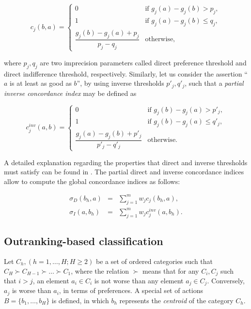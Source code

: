 \documentclass[]{elsarticle}
\theoremstyle{definition}
\begin{document}
{\footnotesize
\begin{equation}
c_j(b,a) =
\begin{cases}
	0							& \mbox{if  $g_j(a)-g_j(b) > p_j$}, \\
	1							& \mbox{if  $g_j(a)-g_j(b) \leq q_j$},   \\
	\dfrac{g_j(b)-g_j(a)+p_j}{p_j-q_j} 	& \mbox{otherwise}, 				     	      
 \end{cases} 
 \label{credibility}
 \end{equation} 
}

\noindent
where $p_j,q_j$ are two imprecision parameters called direct preference threshold and  direct indifference threshold, respectively.  Similarly,  let us consider the assertion ``$a$ is at least as good as $b$'', by using inverse thresholds $p'_j,q'_j$, such that a \emph{partial inverse concordance index} may be defined as 

{\fontsize{7}{7}
\begin{equation}
c^{inv}_j(a,b) =
\begin{cases}
	0							& \mbox{if  $g_j(b)-g_j(a) > p'_j$}, \\
	1							& \mbox{if  $g_j(b)-g_j(a) \leq q'_j$},   \\
	\dfrac{g_j(a)-g_j(b)+p'_j}{p'_j-q'_j} 	& \mbox{otherwise}. 				     	      
 \end{cases} 
 \label{invcredibility}
 \end{equation} 
}


\noindent
A detailed explanation regarding the properties that direct and inverse thresholds must satisfy can be found in \cite{roy2012}.  The partial direct and inverse concordance indices allow to compute the global concordance indices as follows:

\begin{eqnarray}
\sigma_D(b_h,a) 	&=& \sum_{j=1}^{m} w_j c_j(b_h,a),\label{generalsigmaDG}\\
\sigma_I(a,b_h) 	&=& \sum_{j=1}^{m} w_j c^{inv}_j(a,b_h). \label{generalsigmaIG}
\end{eqnarray} 


\subsection{Outranking-based classification}\label{outrankingclass}

Let $C_h, (h=1,\ldots,H; H\geq 2)$ be a set of ordered categories such that $C_H \succ C_{H-1}\succ \ldots \succ C_1$, where  the relation $\succ$ means that for any $C_i, C_ j $ such that $i>j$, an element $a_i \in C_i$ is not worse than any element $a_j \in C_j$. Conversely, $a_j$ is worse than $a_i$, in terms of preferences.   A special set of actions $B=\{b_1,\ldots, b_H\}$ is defined, in which $b_h$ represents the \emph{centroid} of the category $C_h$. 
\end{document}
